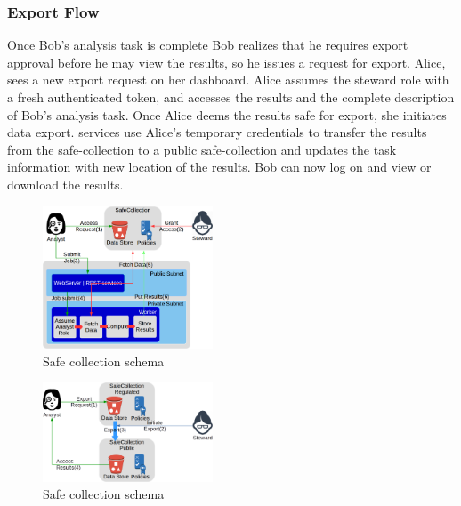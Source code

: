 \subsubsection{Export Flow}

Once Bob's analysis task is complete Bob realizes that he requires export approval before he may view the
results, so he issues a request for export. Alice, sees a new export request on her dashboard. Alice assumes
the steward role with a fresh authenticated token, and accesses the results and the complete description
of Bob's analysis task. Once Alice deems the results safe for export, she initiates data export. \NAME
services use Alice's temporary credentials to transfer the results from the safe-collection to a public
safe-collection and updates the task information with new location of the results. Bob can now log on
and view or download the results.



\begin{figure}
  \center
  \includegraphics[width=0.45\textwidth]{figures/safe_flow.png}
  \caption{Safe collection schema}
  \label{fig:flow1}
  \vspace{-1.5em}
\end{figure}


\begin{figure}
  \center
  \includegraphics[width=0.45\textwidth]{figures/export_flow.png}
  \caption{Safe collection schema}
  \label{fig:flow2}
  \vspace{-1.5em}
\end{figure}









